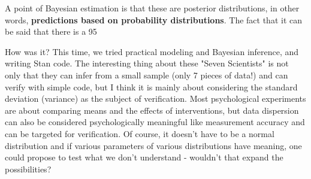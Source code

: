 \documentclass{ltjsbook}
\begin{document}
A point of Bayesian estimation is that these are posterior distributions, in other words, \textbf{predictions based on probability distributions}. The fact that it can be said that there is a 95%

How was it? This time, we tried practical modeling and Bayesian inference, and writing Stan code.
The interesting thing about these "Seven Scientists" is not only that they can infer from a small sample (only 7 pieces of data!) and can verify with simple code, but I think it is mainly about considering the standard deviation (variance) as the subject of verification. Most psychological experiments are about comparing means and the effects of interventions, but data dispersion can also be considered psychologically meaningful like measurement accuracy and can be targeted for verification. Of course, it doesn't have to be a normal distribution and if various parameters of various distributions have meaning, one could propose to test what we don't understand - wouldn't that expand the possibilities?
\end{document}
